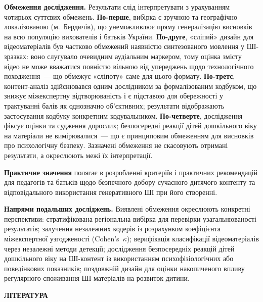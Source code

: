 \documentclass[14pt, a4paper]{extreport}
\newcommand{\myintro}[1]{%
  {\centering\bfseries\MakeUppercase#1\par}%
  \vspace{14pt}%
  \phantomsection
  \addcontentsline{toc}{chapter}{#1}%
}
\begin{document}
\textbf{Обмеження дослідження.}
Результати слід інтерпретувати з урахуванням чотирьох суттєвих обмежень.
\textbf{По-перше}, вибірка є зручною та географічно локалізованою (м.~Бердичів), що унеможливлює пряму генералізацію висновків на всю популяцію вихователів і батьків України.
\textbf{По-друге}, «сліпий» дизайн для відеоматеріалів був частково обмежений наявністю синтезованого мовлення у ШІ-зразках: воно слугувало очевидним аудіальним маркером, тому оцінка змісту відео не може вважатися повністю вільною від упереджень щодо технологічного походження~--- що обмежує «сліпоту» саме для цього формату.
\textbf{По-третє}, контент-аналіз здійснювався одним дослідником за формалізованим кодбуком, що знижує міжекспертну відтворюваність і є підставою для обережності у трактуванні балів як однозначно об'єктивних; результати відображають застосування кодбуку конкретним кодувальником.
\textbf{По-четверте}, дослідження фіксує оцінки та судження дорослих; безпосередні реакції дітей дошкільного віку на матеріали не вимірювалися~--- що є принциповим обмеженням для висновків про психологічну безпеку.
Зазначені обмеження не скасовують отримані результати, а окреслюють межі їх інтерпретації.

\textbf{Практичне значення} полягає в розробленні критеріїв і практичних рекомендацій для педагогів та батьків щодо безпечного добору сучасного дитячого контенту та відповідального використання генеративного ШІ при його створенні.

\textbf{Напрями подальших досліджень.} Виявлені обмеження окреслюють конкретні перспективи: стратифікована регіональна вибірка для перевірки узагальнюваності результатів; залучення незалежних кодерів із розрахунком коефіцієнта міжекспертної узгодженості (Cohen's~$\kappa$); верифікація класифікації відеоматеріалів через незалежні методи детекції; дослідження безпосередніх реакцій дітей дошкільного віку на ШІ-контент із використанням психофізіологічних або поведінкових показників; поздовжній дизайн для оцінки накопиченого впливу регулярного споживання ШІ-матеріалів на розвиток дитини.

\newpage
\myintro{ЛІТЕРАТУРА}
\end{document}
